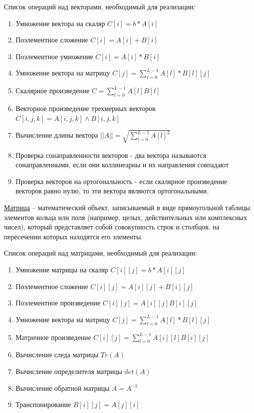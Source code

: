 \documentclass[a4paper,14pt]{extarticle}
\begin{document}
Список операций над векторами, необходимый для реализации:
\begin{enumerate}
	\item Умножение вектора на скаляр $C[i] = b * A[i]$
	\item Поэлементное сложение $C[i] = A[i] + B[i]$
	\item Поэлементное умножение $C[i] = A[i] * B[i]$
	\item Умножение вектора на матрицу 
		$C[j] = \sum\limits_{l=0}^{L-1} A[l] * B[l][j]$ 
	\item Скалярное произведение $C = \sum\limits_{l=0}^{L-1} A[l] B[l]$ 
	\item Векторное произведение трехмерных векторов \\
		$C[i, j, k] = A[i, j, k] \wedge B[i, j, k]$
	\item Вычисление длины вектора
		$|| A || = \sqrt{\sum\limits_{l=0}^{L-1} A[l]^2}$
	\item Проверка сонаправленности векторов - два вектора называются сонаправленными, если они коллинеарны и их направления совпадают
	\item Проверка векторов на ортогональность - если скалярное произведение векторов равно нулю, 
		то эти вектора являются ортогональными.
\end{enumerate}

\href{https://ru.wikipedia.org/wiki/%D0%9C%D0%B0%D1%82%D1%80%D0%B8%D1%86%D0%B0_(%D0%BC%D0%B0%D1%82%D0%B5%D0%BC%D0%B0%D1%82%D0%B8%D0%BA%D0%B0)}{Матрица}
-- математический объект, записываемый в виде прямоугольной таблицы элементов кольца или поля (например, целых, действительных или комплексных чисел), который представляет собой совокупность строк и столбцов, на пересечении которых находятся его элементы.

Список операций над матрицами, необходимый для реализации:
\begin{enumerate}
	\item Умножение матрицы на скаляр $C[i][j] = b * A[i][j]$
	\item Поэлементное сложение $C[i][j] = A[i][j] + B[i][j]$
	\item Поэлементное произведение $C[i][j] = A[i][j]B[i][j]$
	\item Умножение вектора на матрицу 
		$C[j] = \sum\limits_{l=0}^{L-1} A[l] * B[l][j]$
	\item Матричное произведение 
		$C[i][j] = \sum\limits_{l=0}^{L-1} A[i][l] B[i][j]$
	\item Вычисление следа матрицы $Tr(A)$
	\item Вычисление определителя матрицы $det(A)$
	\item Вычисление обратной матрицы $A = A^{-1}$
	\item Транспонирование $B[i][j] = A[j][i]$
\end{enumerate}
\end{document}
